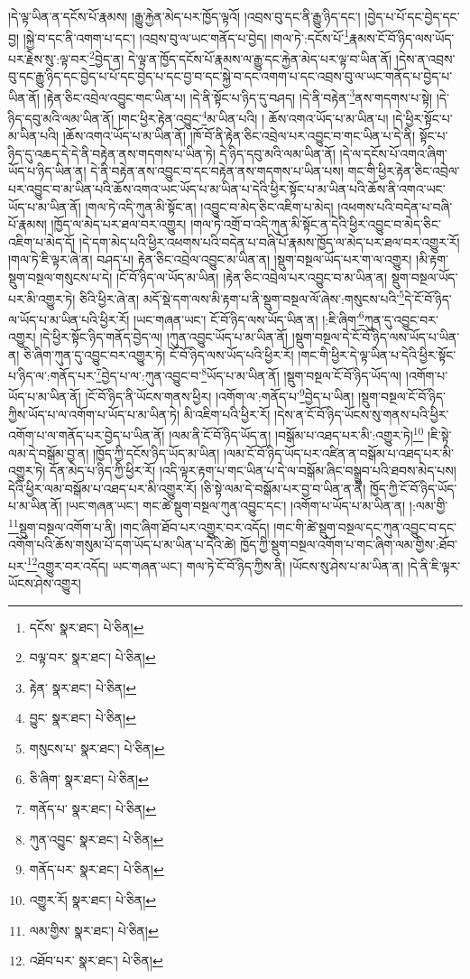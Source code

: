 །དེ་ལྟ་ཡིན་ན་དངོས་པོ་རྣམས། །རྒྱུ་རྐྱེན་མེད་པར་ཁྱོད་ལྟའོ། །འབྲས་བུ་དང་ནི་རྒྱུ་ཉིད་དང་། །བྱེད་པ་པོ་དང་བྱེད་དང་བྱ། །སྐྱེ་བ་དང་ནི་འགག་པ་དང་། །འབྲས་བུ་ལ་ཡང་གནོད་པ་བྱེད། །གལ་ཏེ་:དངོས་པོ་\footnote{དངོས་  སྣར་ཐང་།  པེ་ཅིན། }རྣམས་ངོ་བོ་ཉིད་ལས་ཡོད་པར་རྗེས་སུ་:ལྟ་བར་\footnote{བལྟ་བར་  སྣར་ཐང་།  པེ་ཅིན། }བྱེད་ན། དེ་ལྟ་ན་ཁྱོད་དངོས་པོ་རྣམས་ལ་རྒྱུ་དང་རྐྱེན་མེད་པར་ལྟ་བ་ཡིན་ནོ། །དེས་ན་འབྲས་བུ་དང་རྒྱུ་ཉིད་དང་བྱེད་པ་པོ་དང་བྱེད་པ་དང་བྱ་བ་དང་སྐྱེ་བ་དང་འགག་པ་དང་འབྲས་བུ་ལ་ཡང་གནོད་པ་བྱེད་པ་ཡིན་ནོ། །རྟེན་ཅིང་འབྲེལ་འབྱུང་གང་ཡིན་པ། །དེ་ནི་སྟོང་པ་ཉིད་དུ་བཤད། །དེ་ནི་བརྟེན་\footnote{རྟེན་  སྣར་ཐང་།  པེ་ཅིན། }ནས་གདགས་པ་སྟེ། །དེ་ཉིད་དབུ་མའི་ལམ་ཡིན་ནོ། །གང་ཕྱིར་རྟེན་འབྱུང་\footnote{བྱུང་  སྣར་ཐང་།  པེ་ཅིན། }མ་ཡིན་པའི། །
ཆོས་འགའ་ཡོད་པ་མ་ཡིན་པ། །དེ་ཕྱིར་སྟོང་པ་མ་ཡིན་པའི། །ཆོས་འགའ་ཡོད་པ་མ་ཡིན་ནོ། །ཁོ་བོ་ནི་རྟེན་ཅིང་འབྲེལ་པར་འབྱུང་བ་གང་ཡིན་པ་དེ་ནི། སྟོང་པ་ཉིད་དུ་འཆད་དེ་དེ་ནི་བརྟེན་ནས་གདགས་པ་ཡིན་ཏེ། དེ་ཉིད་དབུ་མའི་ལམ་ཡིན་ནོ། །དེ་ལ་དངོས་པོ་འགའ་ཞིག་ཡོད་པ་ཉིད་ཡིན་ན། དེ་ནི་བརྟེན་ནས་འབྱུང་བ་དང་བརྟེན་ནས་གདགས་པ་ཡིན་པས། གང་གི་ཕྱིར་རྟེན་ཅིང་འབྲེལ་པར་འབྱུང་བ་མ་ཡིན་པའི་ཆོས་འགའ་ཡང་ཡོད་པ་མ་ཡིན་པ་དེའི་ཕྱིར་སྟོང་པ་མ་ཡིན་པའི་ཆོས་ནི་འགའ་ཡང་ཡོད་པ་མ་ཡིན་ནོ། །གལ་ཏེ་འདི་ཀུན་མི་སྟོང་ན། །འབྱུང་བ་མེད་ཅིང་འཇིག་པ་མེད། །འཕགས་པའི་བདེན་པ་བཞི་པོ་རྣམས། །ཁྱོད་ལ་མེད་པར་ཐལ་བར་འགྱུར། །གལ་ཏེ་འགྲོ་བ་འདི་ཀུན་མི་སྟོང་ན་དེའི་ཕྱིར་འབྱུང་བ་མེད་ཅིང་འཇིག་པ་མེད་དོ། །དེ་དག་མེད་པའི་ཕྱིར་འཕགས་པའི་བདེན་པ་བཞི་པོ་རྣམས་ཁྱོད་ལ་མེད་པར་ཐལ་བར་འགྱུར་རོ། །གལ་ཏེ་ཇི་ལྟར་ཞེ་ན། བཤད་པ། རྟེན་ཅིང་འབྲེལ་འབྱུང་མ་ཡིན་ན། །སྡུག་བསྔལ་ཡོད་པར་ག་ལ་འགྱུར། །མི་རྟག་སྡུག་བསྔལ་གསུངས་པ་དེ། །ངོ་བོ་ཉིད་ལ་ཡོད་མ་ཡིན། །རྟེན་ཅིང་འབྲེལ་པར་འབྱུང་བ་མ་ཡིན་ན། སྡུག་བསྔལ་ཡོད་པར་མི་འགྱུར་ཏེ། ཅིའི་ཕྱིར་ཞེ་ན། མདོ་སྡེ་དག་ལས་མི་རྟག་པ་ནི་སྡུག་བསྔལ་ལོ་ཞེས་:གསུངས་པའི་\footnote{གསུངས་པ་  སྣར་ཐང་།  པེ་ཅིན། }དེ་ངོ་བོ་ཉིད་ལ་ཡོད་པ་མ་ཡིན་པའི་ཕྱིར་རོ། །ཡང་གཞན་ཡང་། ངོ་བོ་ཉིད་ལས་ཡོད་ཡིན་ན། །:ཇི་ཞིག་\footnote{ཅི་ཞིག་  སྣར་ཐང་།  པེ་ཅིན། }ཀུན་དུ་འབྱུང་བར་འགྱུར། །དེ་ཕྱིར་སྟོང་ཉིད་གནོད་བྱེད་ལ། །ཀུན་འབྱུང་ཡོད་པ་མ་ཡིན་ནོ། །སྡུག་བསྔལ་དེ་ངོ་བོ་ཉིད་ལས་ཡོད་པ་ཡིན་ན། ཅི་ཞིག་ཀུན་དུ་འབྱུང་བར་འགྱུར་ཏེ། ངོ་བོ་ཉིད་ལས་ཡོད་པའི་ཕྱིར་རོ། །གང་གི་ཕྱིར་དེ་ལྟ་ཡིན་པ་དེའི་ཕྱིར་སྟོང་པ་ཉིད་ལ་:གནོད་པར་\footnote{གནོད་པ་  སྣར་ཐང་།  པེ་ཅིན། }བྱེད་པ་ལ་:ཀུན་འབྱུང་བ་\footnote{ཀུན་འབྱུང་  སྣར་ཐང་།  པེ་ཅིན། }ཡོད་པ་མ་ཡིན་ནོ། །སྡུག་བསྔལ་ངོ་བོ་ཉིད་ཡོད་ལ། །འགོག་པ་ཡོད་པ་མ་ཡིན་ནོ། །ངོ་བོ་ཉིད་ནི་ཡོངས་གནས་ཕྱིར། །འགོག་ལ་:གནོད་པ་\footnote{གནོད་པར་  སྣར་ཐང་།  པེ་ཅིན། }བྱེད་པ་ཡིན། །སྡུག་བསྔལ་ངོ་བོ་ཉིད་ཀྱིས་ཡོད་པ་ལ་འགོག་པ་ཡོད་པ་མ་ཡིན་ཏེ། མི་འཇིག་པའི་ཕྱིར་རོ། །དེས་ན་ངོ་བོ་ཉིད་ཡོངས་སུ་གནས་པའི་ཕྱིར་འགོག་པ་ལ་གནོད་པར་བྱེད་པ་ཡིན་ནོ། །ལམ་ནི་ངོ་བོ་ཉིད་ཡོད་ན། །བསྒོམ་པ་འཐད་པར་མི་:འགྱུར་ཏེ།\footnote{འགྱུར་རོ།  སྣར་ཐང་།  པེ་ཅིན། } །ཇི་སྟེ་ལམ་དེ་བསྒོམ་བྱ་ན། །ཁྱོད་ཀྱི་དངོས་ཉིད་ཡོད་མ་ཡིན། །ལམ་ངོ་བོ་ཉིད་ཡོད་པར་འཛིན་ན་བསྒོམ་པ་འཐད་པར་མི་འགྱུར་ཏེ། དོན་མེད་པ་ཉིད་ཀྱི་ཕྱིར་རོ། །འདི་ལྟར་རྟག་པ་གང་ཡིན་པ་དེ་ལ་བསྒོམ་ཞིང་བསྒྲུབ་པའི་ཐབས་མེད་པས། དེའི་ཕྱིར་ལམ་བསྒོམ་པ་འཐད་པར་མི་འགྱུར་རོ། །ཅི་སྟེ་ལམ་དེ་བསྒོམ་པར་བྱ་བ་ཡིན་ན་ནི། ཁྱོད་ཀྱི་ངོ་བོ་ཉིད་ཡོད་པ་མ་ཡིན་ནོ། །ཡང་གཞན་ཡང་། གང་ཚེ་སྡུག་བསྔལ་ཀུན་འབྱུང་དང་། །འགོག་པ་ཡོད་པ་མ་ཡིན་ན། །:ལམ་གྱི་\footnote{ལམ་གྱིས་  སྣར་ཐང་།  པེ་ཅིན། }སྡུག་བསྔལ་འགོག་པ་ནི། །གང་ཞིག་ཐོབ་པར་འགྱུར་བར་འདོད། །གང་གི་ཚེ་སྡུག་བསྔལ་དང་ཀུན་འབྱུང་བ་དང་འགོག་པའི་ཆོས་གསུམ་པོ་དག་ཡོད་པ་མ་ཡིན་པ་དེའི་ཚེ། ཁྱོད་ཀྱི་སྡུག་བསྔལ་འགོག་པ་གང་ཞིག་ལམ་གྱིས་:ཐོབ་པར་\footnote{འཐོབ་པར་  སྣར་ཐང་།  པེ་ཅིན། }འགྱུར་བར་འདོད། ཡང་གཞན་ཡང་། གལ་ཏེ་ངོ་བོ་ཉིད་ཀྱིས་ནི། །ཡོངས་སུ་ཤེས་པ་མ་ཡིན་ན། །དེ་ནི་ཇི་ལྟར་ཡོངས་ཤེས་འགྱུར། 